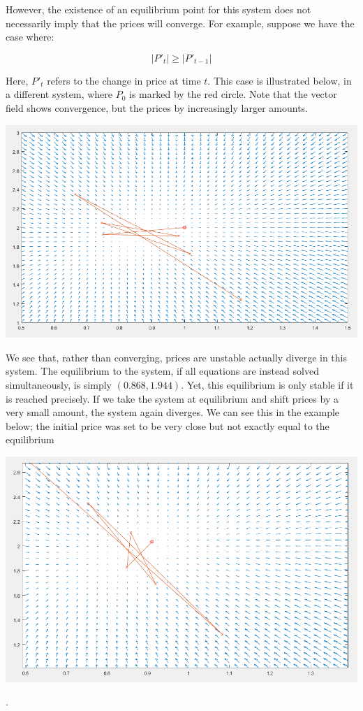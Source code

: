 \documentclass[12pt]{article}
\begin{document}
However, the existence of an equilibrium point for this system does not necessarily imply that the prices will converge. For example, suppose we have the case where:

$$| P'_t | \geq | P'_{t-1} | $$

Here, $P'_t$ refers to the change in price at time $t$. This case is illustrated below, in a different system, where $P_0$ is marked by the red circle. Note that the vector field shows convergence, but the prices by increasingly larger amounts. 

\begin{center}
	\includegraphics[scale = 0.5]{figures/vector_field2}
\end{center}

We see that, rather than converging, prices are unstable actually diverge in this system. The equilibrium to the system, if all equations are instead solved simultaneously, is simply $(0.868,1.944)$. Yet, this equilibrium is only stable if it is reached precisely. If we take the system at equilibrium and shift prices by a very small amount, the system again diverges. We can see this in the example below; the initial price was set to be very close but not exactly equal to the equilibrium

\begin{center}
	\includegraphics[scale = 0.5]{figures/vector_field3}
\end{center}
. 
\end{document}
